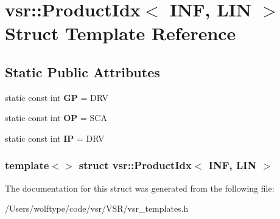 \hypertarget{structvsr_1_1_product_idx_3_01_i_n_f_00_01_l_i_n_01_4}{\section{vsr\-:\-:Product\-Idx$<$ I\-N\-F, L\-I\-N $>$ Struct Template Reference}
\label{structvsr_1_1_product_idx_3_01_i_n_f_00_01_l_i_n_01_4}
}
\subsection*{Static Public Attributes}
\begin{DoxyCompactItemize}
\item 
\hypertarget{structvsr_1_1_product_idx_3_01_i_n_f_00_01_l_i_n_01_4_af5f0b699fae1da382c3e86b7bf3e8efb}{static const int {\bfseries G\-P} = D\-R\-V}\label{structvsr_1_1_product_idx_3_01_i_n_f_00_01_l_i_n_01_4_af5f0b699fae1da382c3e86b7bf3e8efb}

\item 
\hypertarget{structvsr_1_1_product_idx_3_01_i_n_f_00_01_l_i_n_01_4_a2a25a0c67f6c9e4660348c310cb8b1d4}{static const int {\bfseries O\-P} = S\-C\-A}\label{structvsr_1_1_product_idx_3_01_i_n_f_00_01_l_i_n_01_4_a2a25a0c67f6c9e4660348c310cb8b1d4}

\item 
\hypertarget{structvsr_1_1_product_idx_3_01_i_n_f_00_01_l_i_n_01_4_ae9512d3aa188ab6a8ba4db896ac9c1dc}{static const int {\bfseries I\-P} = D\-R\-V}\label{structvsr_1_1_product_idx_3_01_i_n_f_00_01_l_i_n_01_4_ae9512d3aa188ab6a8ba4db896ac9c1dc}

\end{DoxyCompactItemize}
\subsubsection*{template$<$$>$ struct vsr\-::\-Product\-Idx$<$ I\-N\-F, L\-I\-N $>$}



The documentation for this struct was generated from the following file\-:\begin{DoxyCompactItemize}
\item 
/\-Users/wolftype/code/vsr/\-V\-S\-R/vsr\-\_\-templates.\-h\end{DoxyCompactItemize}
